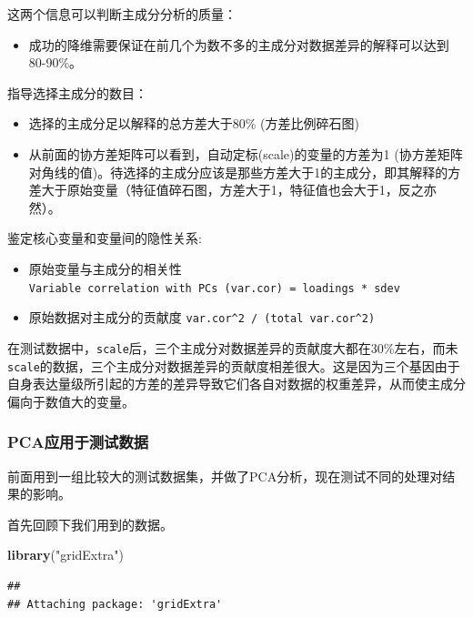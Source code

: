 \documentclass[]{article}
\newenvironment{Shaded}{\begin{snugshade}}{\end{snugshade}}
\newcommand{\KeywordTok}[1]{\textcolor[rgb]{0.13,0.29,0.53}{\textbf{{#1}}}}
\newcommand{\StringTok}[1]{\textcolor[rgb]{0.31,0.60,0.02}{{#1}}}
\newcommand{\NormalTok}[1]{{#1}}
\providecommand{\tightlist}{%
  \setlength{\itemsep}{0pt}\setlength{\parskip}{0pt}}
\numberwithin{figure}{section}
\numberwithin{table}{section}
\theoremstyle{definition}
\theoremstyle{definition}
\theoremstyle{definition}
\theoremstyle{remark}
\begin{document}
这两个信息可以判断主成分分析的质量：

\begin{itemize}
\tightlist
\item
  成功的降维需要保证在前几个为数不多的主成分对数据差异的解释可以达到80-90\%。
\end{itemize}

指导选择主成分的数目：

\begin{itemize}
\tightlist
\item
  选择的主成分足以解释的总方差大于80\% (方差比例碎石图)
\item
  从前面的协方差矩阵可以看到，自动定标(scale)的变量的方差为1
  (协方差矩阵对角线的值)。待选择的主成分应该是那些方差大于1的主成分，即其解释的方差大于原始变量（特征值碎石图，方差大于1，特征值也会大于1，反之亦然）。
\end{itemize}

鉴定核心变量和变量间的隐性关系:

\begin{itemize}
\tightlist
\item
  原始变量与主成分的相关性
  \texttt{Variable\ correlation\ with\ PCs\ (var.cor)\ =\ loadings\ *\ sdev}
\item
  原始数据对主成分的贡献度
  \texttt{var.cor\^{}2\ /\ (total\ var.cor\^{}2)}
\end{itemize}

在测试数据中，\texttt{scale}后，三个主成分对数据差异的贡献度大都在30\%左右，而未\texttt{scale}的数据，三个主成分对数据差异的贡献度相差很大。这是因为三个基因由于自身表达量级所引起的方差的差异导致它们各自对数据的权重差异，从而使主成分偏向于数值大的变量。

\subsubsection{PCA应用于测试数据}\label{pca}

前面用到一组比较大的测试数据集，并做了PCA分析，现在测试不同的处理对结果的影响。

首先回顾下我们用到的数据。

\begin{Shaded}
\begin{Highlighting}[]
\KeywordTok{library}\NormalTok{(}\StringTok{"gridExtra"}\NormalTok{)}
\end{Highlighting}
\end{Shaded}

\begin{verbatim}
## 
## Attaching package: 'gridExtra'
\end{verbatim}
\end{document}
